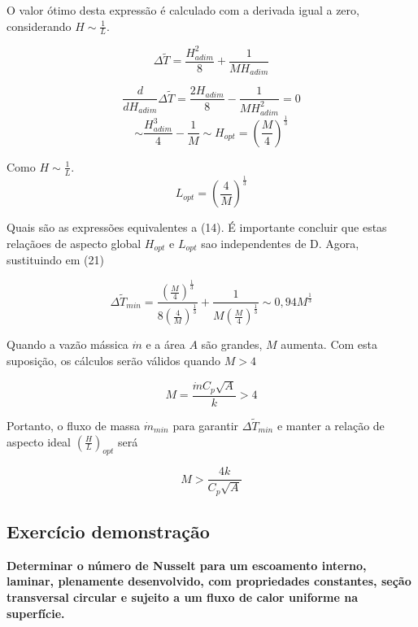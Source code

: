 \documentclass[12pt]{article}
\begin{document}
O valor ótimo desta expressão é calculado com a derivada igual a zero, considerando $H\sim \frac{1}{L}$.

\begin{equation}
	\Delta \widetilde{T} = \frac{H_{adim}^{2}}{8} + \frac{1}{MH_{adim}}
\end{equation}

\begin{equation}
	\frac{d}{dH_{adim}}\Delta \widetilde{T} = \frac{2H_{adim}}{8} - \frac{1}{MH_{adim}^{2}} = 0
\end{equation}
\begin{equation}
	 \sim \frac{H_{adim}^{3}}{4} - \frac{1}{M} \sim H_{opt} = \left( \frac{M}{4}\right) ^{\frac{1}{3}}
\end{equation}

Como $H\sim \frac{1}{L}$.
\begin{equation}
	L_{opt} = \left( \frac{4}{M}\right) ^{\frac{1}{3}}
\end{equation}

Quais são as expressões equivalentes a (14). É importante concluir que estas relaçãoes de aspecto global $H_{opt}$ e $L_{opt}$ sao independentes de D.  Agora, sustituindo em (21)



\begin{equation}
	\Delta \widetilde{T}_{min} = \frac{\left( \frac{M}{4}\right) ^{\frac{1}{3}}}{8\left( \frac{4}{M}\right) ^{\frac{1}{3}}} + \frac{1}{M\left( \frac{M}{4}\right) ^{\frac{1}{3}}} \sim 0,94 M^{\frac{1}{3}}
\end{equation}

Quando a vazão mássica $\dot{m}$ e a área $A$ são grandes, $M$ aumenta. Com esta suposição, os cálculos serão válidos quando $M > 4$



\begin{equation}
	M = \frac{\dot{m} C_{p} \sqrt{A}}{k} > 4
\end{equation}

Portanto, o fluxo de massa $\dot{m}_{min}$ para garantir $\Delta \widetilde{T}_{min}$ e manter a relação de aspecto ideal $\left( \frac{H}{L}\right)_{opt} $ será

\begin{equation}
	M > \frac{4k}{C_{p}\sqrt{A}}
\end{equation}


\subsection*{Exercício demonstração}
\textbf{Determinar o número de Nusselt para um escoamento interno, laminar, plenamente desenvolvido, com propriedades constantes, seção transversal circular e sujeito a um fluxo de calor uniforme na superfície.}\\
\end{document}
